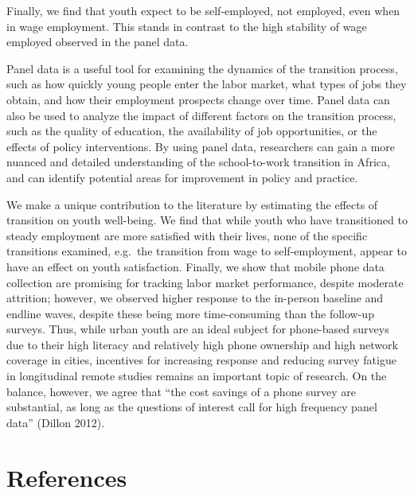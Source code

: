 \documentclass[
  11pt,
a4paper
]{article}
\begin{document}
Finally, we find that youth expect to be self-employed, not employed, even when in wage employment. This stands in contrast to the high stability of wage employed observed in the panel data.

Panel data is a useful tool for examining the dynamics of the transition process, such as how quickly young people enter the labor market, what types of jobs they obtain, and how their employment prospects change over time. Panel data can also be used to analyze the impact of different factors on the transition process, such as the quality of education, the availability of job opportunities, or the effects of policy interventions. By using panel data, researchers can gain a more nuanced and detailed understanding of the school-to-work transition in Africa, and can identify potential areas for improvement in policy and practice.

We make a unique contribution to the literature by estimating the effects of transition on youth well-being. We find that while youth who have transitioned to steady employment are more satisfied with their lives, none of the specific transitions examined, e.g.~the transition from wage to self-employment, appear to have an effect on youth satisfaction. Finally, we show that mobile phone data collection are promising for tracking labor market performance, despite moderate attrition; however, we observed higher response to the in-person baseline and endline waves, despite these being more time-consuming than the follow-up surveys. Thus, while urban youth are an ideal subject for phone-based surveys due to their high literacy and relatively high phone ownership and high network coverage in cities, incentives for increasing response and reducing survey fatigue in longitudinal remote studies remains an important topic of research. On the balance, however, we agree that ``the cost savings of a phone survey are substantial, as long as the questions of interest call for high frequency panel data'' (Dillon 2012).

\newpage

\hypertarget{references}{%
\section*{References}\label{references}}

\noindent
\end{document}
